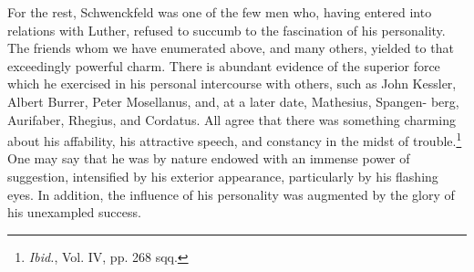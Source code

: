 For the rest, Schwenckfeld was one of the few men who, having
entered into relations with Luther, refused to succumb to the fascination
of his personality. The friends whom we have enumerated
above, and many others, yielded to that exceedingly powerful charm.
There is abundant evidence of the superior force which he exercised
in his personal intercourse with others, such as John Kessler, Albert
Burrer, Peter Mosellanus, and, at a later date, Mathesius, Spangen-
berg, Aurifaber, Rhegius, and Cordatus. All agree that there was
something charming about his affability, his attractive speech, and
constancy in the midst of trouble.\footnote{\textit{Ibid.}, Vol. IV, pp. 268 sqq.}
One may say that he was by
nature endowed with an immense power of suggestion, intensified by
his exterior appearance, particularly by his flashing eyes. In addition,
the influence of his personality was augmented by the glory of his
unexampled success.
